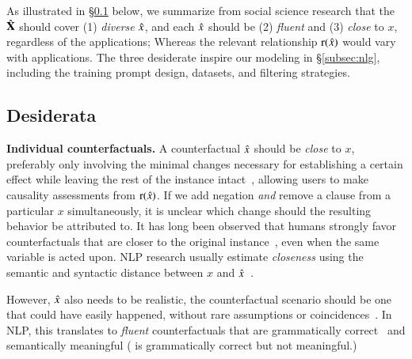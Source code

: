 As illustrated in \S\ref{sec:desiderata} below, we summarize from social science research that the $\hat{\mathbf{X}}$ should cover (1) \emph{diverse} $\hat{x}$, and each $\hat{x}$ should be (2) \emph{fluent} and (3) \emph{close} to $x$, regardless of the applications; Whereas the relevant relationship $\operatorname*{r}(\hat{x})$ would vary with applications.
The three desiderate inspire our modeling in \S\ref{subsec:nlg}, including the training prompt design, datasets, and filtering strategies.


% 
\subsection{Desiderata}
\label{sec:desiderata}


\textbf{Individual counterfactuals.} 
A counterfactual $\hat{x}$ should be \emph{close} to $x$, preferably only involving the minimal changes necessary for establishing a certain effect while leaving the rest of the instance intact~\cite{pearl2018causal}, allowing users to make causality assessments from $\operatorname*{r}(\hat{x})$. 
If we add negation \emph{and} remove a clause from a particular $x$ simultaneously, it is unclear which change should the resulting behavior be attributed to. 
It has long been observed that humans strongly favor counterfactuals that are closer to the original instance~\cite{kahneman}, even when the same variable is acted upon.
NLP research usually estimate \emph{closeness} using the semantic and syntactic distance between $x$ and $\hat{x}$~\cite{morris2020textattack, madaan2020generate}.

However, $\hat{x}$ also needs to be realistic, \ie the counterfactual scenario should be one that could have easily happened, without rare assumptions or coincidences~\cite{kahneman}. 
In NLP, this translates to \emph{fluent} counterfactuals that are grammatically correct~\cite{morris2020textattack} and semantically meaningful (\eg {} is grammatically correct but not meaningful.) 

